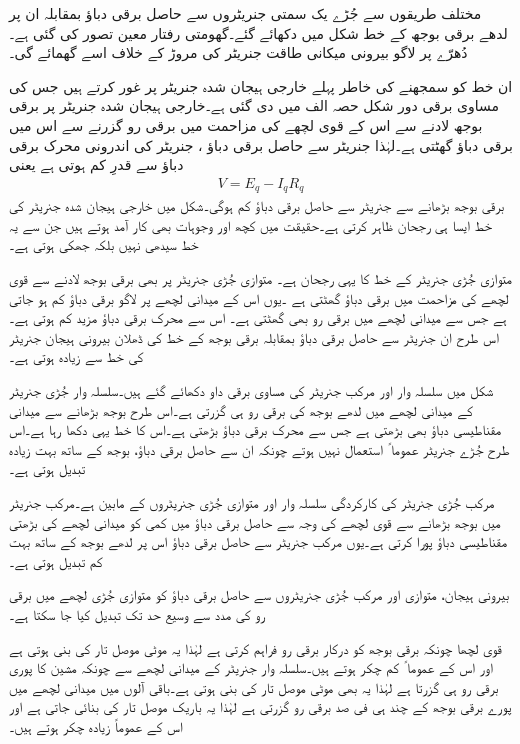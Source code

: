 مختلف طریقوں سے جُڑے یک سمتی جنریٹروں سے حاصل برقی دباؤ بمقابلہ ان پر لدھے برقی بوجھ کے خط شکل  میں دکھائے گئے۔گھومتی رفتار معین تصور کی گئی ہے۔دُھرّے پر لاگو بیرونی میکانی طاقت جنریٹر کی مروڑ کے خلاف اسے گھمائے گی۔

ان خط کو سمجھنے کی خاطر پہلے خارجی ہیجان شدہ جنریٹر پر غور کرتے ہیں جس کی مساوی برقی دور شکل  حصہ الف میں دی گئی ہے۔خارجی ہیجان شدہ جنریٹر پر برقی بوجھ لادنے سے اس کے قوی لچھے کی مزاحمت  میں برقی رو   گزرنے سے اس میں برقی دباؤ گھٹتی ہے۔لہٰذا جنریٹر سے حاصل برقی دباؤ ، جنریٹر کی اندرونی محرک برقی دباؤ   سے قدرِ کم ہوتی ہے یعنی
\begin{align}
V=E_q-I_q R_q
\end{align}
برقی بوجھ  بڑھانے سے جنریٹر سے حاصل برقی دباؤ کم ہوگی۔شکل میں خارجی ہیجان شدہ جنریٹر کی خط ایسا ہی رجحان ظاہر کرتی ہے۔حقیقت میں کچھ اور وجوہات بھی کار آمد ہوتے ہیں جن سے یہ خط سیدھی نہیں بلکہ جھکی ہوتی ہے۔ 

متوازی جُڑی جنریٹر کے خط کا یہی رجحان ہے۔ متوازی جُڑی جنریٹر پر بھی برقی بوجھ لادنے سے قوی لچھے کی مزاحمت میں برقی دباؤ گھٹتی ہے ۔یوں اس کے میدانی لچھے پر لاگو برقی دباؤ کم ہو جاتی ہے جس سے میدانی لچھے میں برقی رو بھی گھٹتی ہے۔ اس سے محرک برقی دباؤ مزید کم ہوتی ہے۔اس طرح ان جنریٹر سے حاصل برقی دباؤ بمقابلہ برقی بوجھ کے خط کی ڈھلان بیرونی ہیجان جنریٹر کی خط سے زیادہ ہوتی ہے۔

شکل  میں سلسلہ وار اور مرکب جنریٹر کی مساوی برقی داو دکھائے گئے ہیں۔سلسلہ وار جُڑی جنریٹر کے میدانی لچھے میں لدھے  بوجھ کی برقی رو ہی گزرتی ہے۔اس طرح بوجھ بڑھانے سے میدانی مقناطیسی دباؤ بھی بڑھتی ہے جس سے محرک برقی دباؤ بڑھتی ہے۔اس کا خط یہی دکھا رہا ہے۔اس طرح جُڑے جنریٹر عموما ً استعمال نہیں ہوتے چونکہ ان سے حاصل برقی دباؤ، بوجھ کے ساتھ بہت زیادہ تبدیل ہوتی ہے۔ 

مرکب جُڑی جنریٹر کی کارکردگی سلسلہ وار اور متوازی جُڑی جنریٹروں کے مابین ہے۔مرکب جنریٹر میں بوجھ بڑھانے سے قوی لچھے کی وجہ سے حاصل برقی دباؤ میں کمی کو میدانی لچھے کی بڑھتی مقناطیسی دباؤ پورا کرتی ہے۔یوں مرکب جنریٹر سے حاصل برقی دباؤ اس پر لدھے بوجھ کے ساتھ بہت کم تبدیل ہوتی ہے۔

بیرونی ہیجان، متوازی اور مرکب جُڑی جنریٹروں سے حاصل برقی دباؤ کو متوازی جُڑی لچھے میں برقی رو کی مدد سے وسیع حد تک تبدیل کیا جا سکتا ہے۔

قوی لچھا چونکہ برقی بوجھ کو درکار برقی رو فراہم کرتی ہے لہٰذا یہ موٹی موصل تار کی بنی ہوتی ہے اور اس کے عموما ً کم چکر ہوتے ہیں۔سلسلہ وار جنریٹر کے میدانی لچھے سے چونکہ مشین کا پوری برقی رو ہی گزرتا ہے لہٰذا یہ بھی موٹی موصل تار کی بنی ہوتی ہے۔باقی آلوں میں میدانی لچھے میں پورے برقی بوجھ کے چند ہی فی صد برقی رو گزرتی ہے لہٰذا یہ باریک موصل تار کی بنائی جاتی ہے اور اس کے عموماً زیادہ چکر ہوتے ہیں۔

